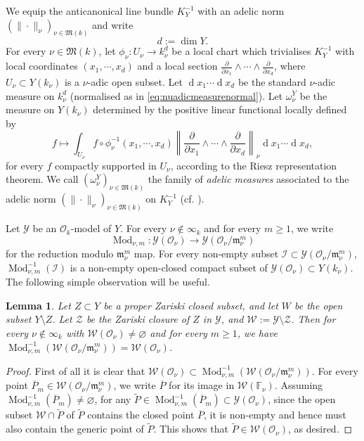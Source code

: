 \documentclass[11pt,letterpaper]{amsart}
\newcommand{\BF}{{\mathbb {F}}}
\newcommand{\CI}{{\mathcal {I}}}
\newcommand{\CO}{{\mathcal {O}}}
\newcommand{\CW}{{\mathcal {W}}}
\newcommand{\CY}{{\mathcal {Y}}}
\newcommand{\CZ}{{\mathcal {Z}}}
\theoremstyle{plain}
\numberwithin{equation}{section}
\newtheorem{lemma}[theorem]{Lemma}
\theoremstyle{definition}
\theoremstyle{remark}
\begin{document}
We equip the anticanonical line bundle $K_Y^{-1}$ with an adelic norm $(\|\cdot\|_\nu)_{\nu\in\mathfrak{M}(k)}$ and write $$d:=\dim Y.$$ For every $\nu\in\mathfrak{M}(k)$, let $\phi_\nu:U_\nu\to k_\nu^{d}$  be a local chart which trivialises $K_Y^{-1}$ with local coordinates $(x_1,\cdots,x_d)$ and a local section $\frac{\partial}{\partial x_1}\wedge\cdots\wedge \frac{\partial}{\partial x_{d}}$, where $U_\nu\subset Y(k_\nu)$ is a $\nu$-adic open subset. Let $\operatorname{d}x_{1}\cdots\operatorname{d}x_{d}$  be the standard $\nu$-adic measure on $k_\nu^{d}$ (normalised as in \eqref{eq:nuadicmeasurenormal}). Let $\omega^Y_\nu$ be the measure on $Y(k_\nu)$ determined by the positive linear functional locally defined by $$f\mapsto\int_{U_\nu} f\circ\phi_\nu^{-1}(x_1,\cdots,x_d)\left\|\frac{\partial}{\partial x_1}\wedge\cdots\wedge \frac{\partial}{\partial x_d}\right\|_\nu\operatorname{d}x_{1}\cdots\operatorname{d}x_{d},$$
for every $f$ compactly supported in $U_\nu$, according to the Riesz representation theorem. 
We call $(\omega_\nu^Y)_{\nu\in\mathfrak{M}(k)}$ the family of \emph{adelic measures} associated to the adelic norm $(\|\cdot\|_\nu)_{\nu\in\mathfrak{M}(k)}$ on $K_Y^{-1}$ (cf. \cite[\S3.2 Construction 3.6]{PeyreBeyond}).

Let $\CY$ be an $\CO_k$-model of $Y$. For every $\nu\notin \infty_k$ and for every $m\geqslant 1$, we write 
\begin{equation}\label{eq:redmodpk}
	\operatorname{Mod}_{\nu,m}:\CY(\CO_\nu)\longrightarrow \CY(\CO_\nu/\mathfrak{m}_{\nu}^m) 
\end{equation}
for the reduction modulo $\mathfrak{m}_{\nu}^m$ map. 
For every non-empty subset $\CI\subset\CY(\CO_\nu/\mathfrak{m}_{\nu}^m) $, $\operatorname{Mod}_{\nu,m}^{-1}(\CI)$ is a non-empty open-closed compact subset of $\CY(\CO_\nu)\subset Y(k_\nu)$.  
The following simple observation will be useful.
\begin{lemma}\label{le:preparation}
	Let $Z\subset Y$  be a proper  Zariski closed subset, and let $W$ be the open subset $Y\setminus Z$. Let $\CZ$ be the Zariski closure of $Z$  in $\CY$, and $\CW:=\CY\setminus\CZ$. Then for every $\nu\notin \infty_k$ with $\CW(\CO_\nu)\neq\varnothing$ and for every $m\geqslant 1$, we have $\operatorname{Mod}_{\nu,m}^{-1}(\CW(\CO_\nu/\mathfrak{m}_\nu^m))=\CW(\CO_\nu)$.
\end{lemma}
\begin{proof}
	First of all it is clear that $\CW(\CO_\nu)\subset \operatorname{Mod}_{\nu,m}^{-1}(\CW(\CO_\nu/\mathfrak{m}_\nu^m))$. For every point $\overline{P}_m\in \CW(\CO_\nu/\mathfrak{m}_\nu^m)$, we write $\overline{P}$ for its image in $\CW(\BF_\nu)$. Assuming $\operatorname{Mod}_{\nu,m}^{-1}(\overline{P}_m)\neq\varnothing$, for any $\widetilde{P}\in \operatorname{Mod}_{\nu,m}^{-1}(\overline{P}_m)\subset \CY(\CO_\nu)$, since the open subset $\CW\cap \widetilde{P}$ of $\widetilde{P}$ contains the closed point $\overline{P}$, it is non-empty and hence must also contain the generic point of $\widetilde{P}$. This shows that $\widetilde{P}\in \CW(\CO_\nu)$, as desired.
\end{proof}
\end{document}
